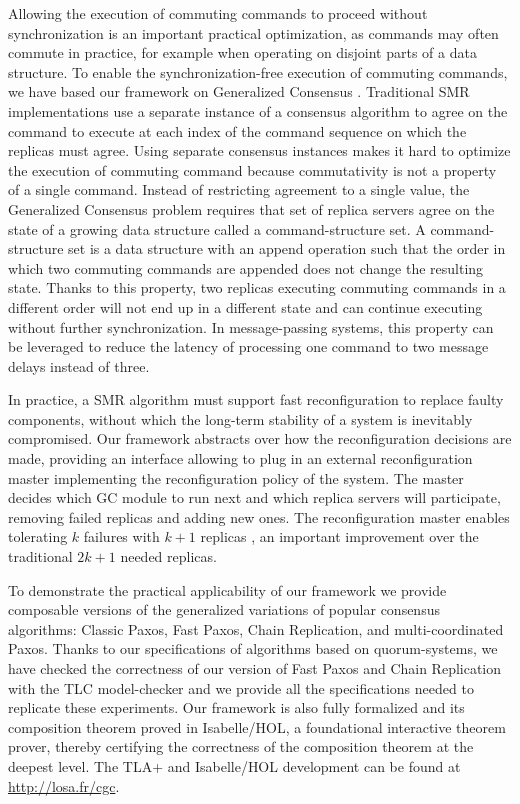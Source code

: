 Allowing the execution of commuting commands to proceed without
synchronization is an important practical optimization, as commands may
often commute in practice, for example when operating on disjoint parts
of a data structure. To enable the synchronization-free execution of
commuting commands, we have based our framework on Generalized Consensus
\cite{Lamport05GeneralizeConsensus}. Traditional SMR implementations use a
separate instance of a consensus algorithm to agree on the command to execute
at each index of the command sequence on which the replicas must agree. Using
separate consensus instances makes it hard to optimize the execution of
commuting command because commutativity is not a property of a single command.
Instead of restricting agreement to a single value, the Generalized Consensus
problem requires that set of replica servers agree on the state of a growing
data structure called a command-structure set. A command-structure set is
a data structure with an append operation such that the order in which two
commuting commands are appended does not change the resulting state. Thanks to
this property, two replicas executing commuting commands in a different order
will not end up in a different state and can continue executing without further
synchronization. In message-passing systems, this property can be leveraged to
reduce the latency of processing one command to two message delays instead of
three. 

In practice, a SMR algorithm must support fast reconfiguration to replace
faulty components, without which the long-term stability of a system is
inevitably compromised. Our framework abstracts over how the reconfiguration
decisions are made, providing an interface allowing to plug in an external
reconfiguration master implementing the reconfiguration policy of the
system. The master decides which GC module to run next and which replica
servers will participate, removing failed replicas and adding new ones. The
reconfiguration master enables tolerating $k$ failures with $k+1$ replicas
\cite{LamportMalkhiZhou09VerticalPaxosPrimarybackupReplication}, an important
improvement over the traditional $2k+1$ needed replicas.

To demonstrate the practical applicability of our framework we provide
composable versions of the generalized variations of popular consensus
algorithms: Classic Paxos, Fast Paxos, Chain Replication, and multi-coordinated
Paxos. Thanks to our specifications of algorithms based on quorum-systems, 
we have checked the correctness of our version of Fast Paxos and Chain Replication with the TLC
model-checker and we provide all the specifications needed to replicate these
experiments. Our framework is also fully formalized and its composition theorem
proved in Isabelle/HOL, a foundational interactive theorem prover, thereby
certifying the correctness of the composition theorem at the deepest level.
The TLA+ and Isabelle/HOL development can be found at \url{http://losa.fr/cgc}.

